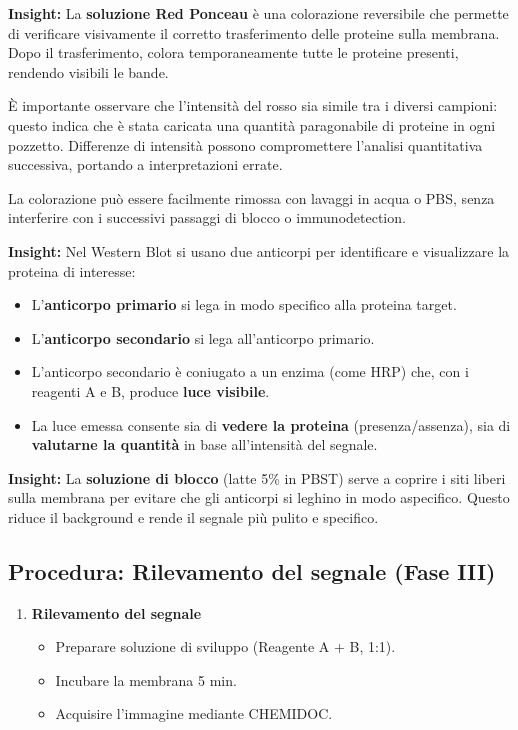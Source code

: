 \begin{insightBox}
    \textbf{Insight:} 
    La \textbf{soluzione Red Ponceau} è una colorazione reversibile che permette di verificare visivamente il corretto trasferimento delle proteine sulla membrana. 
    Dopo il trasferimento, colora temporaneamente tutte le proteine presenti, rendendo visibili le bande.

    \medskip
    È importante osservare che l’intensità del rosso sia simile tra i diversi campioni: 
    questo indica che è stata caricata una quantità paragonabile di proteine in ogni pozzetto. Differenze di intensità possono compromettere l’analisi quantitativa successiva, portando a interpretazioni errate.

    \medskip
    La colorazione può essere facilmente rimossa con lavaggi in acqua o PBS, senza interferire con i successivi passaggi di blocco o immunodetection.
\end{insightBox}
\begin{insightBox}
	\textbf{Insight:} Nel Western Blot si usano due anticorpi per identificare e visualizzare la proteina di interesse:
	\begin{itemize}
		\item L’\textbf{anticorpo primario} si lega in modo specifico alla proteina target.
		\item L’\textbf{anticorpo secondario} si lega all’anticorpo primario.
		\item L’anticorpo secondario è coniugato a un enzima (come HRP) che, con i reagenti A e B, produce \textbf{luce visibile}.
		\item La luce emessa consente sia di \textbf{vedere la proteina} (presenza/assenza), sia di \textbf{valutarne la quantità} in base all’intensità del segnale.
	\end{itemize}
\end{insightBox}

\begin{insightBox}
	\textbf{Insight:} La \textbf{soluzione di blocco} (latte 5\% in PBST) serve a coprire i siti liberi sulla membrana per evitare che gli anticorpi si leghino in modo aspecifico.  
	Questo riduce il background e rende il segnale più pulito e specifico.
\end{insightBox}



\subsection{Procedura: Rilevamento del segnale (Fase III)}
\begin{enumerate}  
  \item \textbf{Rilevamento del segnale}
    \begin{itemize}
      \item Preparare soluzione di sviluppo (Reagente A + B, 1:1).
      \item Incubare la membrana 5 min.
      \item Acquisire l'immagine mediante CHEMIDOC.
    \end{itemize}
\end{enumerate}
\newpage